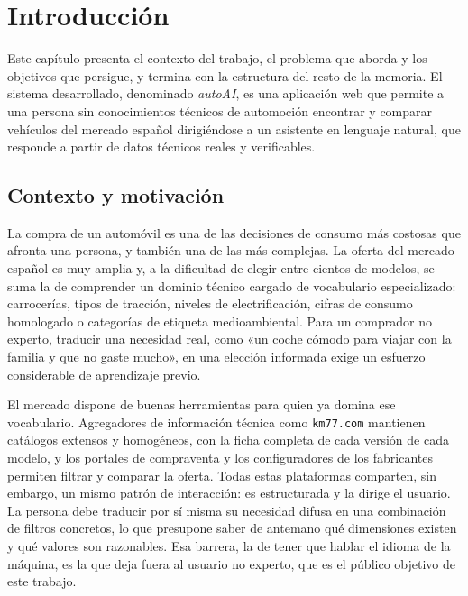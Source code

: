 
\chapter{Introducción}
\label{sec:intro}

Este capítulo presenta el contexto del trabajo, el problema que aborda y los
objetivos que persigue, y termina con la estructura del resto de la memoria. El
sistema desarrollado, denominado \emph{autoAI}, es una aplicación web que permite
a una persona sin conocimientos técnicos de automoción encontrar y comparar
vehículos del mercado español dirigiéndose a un asistente en lenguaje natural,
que responde a partir de datos técnicos reales y verificables.

\section{Contexto y motivación}
\label{sec:intro-contexto}

La compra de un automóvil es una de las decisiones de consumo más costosas que
afronta una persona, y también una de las más complejas. La oferta del mercado
español es muy amplia y, a la dificultad de elegir entre cientos de modelos, se
suma la de comprender un dominio técnico cargado de vocabulario especializado:
carrocerías, tipos de tracción, niveles de electrificación, cifras de consumo
homologado o categorías de etiqueta medioambiental. Para un comprador no experto,
traducir una necesidad real, como «un coche cómodo para viajar con la familia y
que no gaste mucho», en una elección informada exige un esfuerzo considerable de
aprendizaje previo.

El mercado dispone de buenas herramientas para quien ya domina ese vocabulario.
Agregadores de información técnica como \texttt{km77.com} mantienen catálogos
extensos y homogéneos, con la ficha completa de cada versión de cada modelo, y
los portales de compraventa y los configuradores de los fabricantes permiten
filtrar y comparar la oferta. Todas estas plataformas comparten, sin embargo, un
mismo patrón de interacción: es estructurada y la dirige el usuario. La persona
debe traducir por sí misma su necesidad difusa en una combinación de filtros
concretos, lo que presupone saber de antemano qué dimensiones existen y qué
valores son razonables. Esa barrera, la de tener que hablar el idioma de la
máquina, es la que deja fuera al usuario no experto, que es el público objetivo
de este trabajo.

